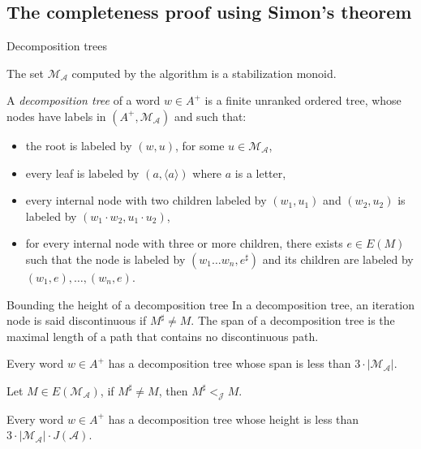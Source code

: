 \documentclass[svgnames]{beamer}
\renewcommand{\AA}{\mathcal{A}}
\newcommand{\JJ}{\mathcal{J}}
\newcommand{\MM}{\mathcal{M}}
\newcommand{\MMAA}{\MM_\AA}
\newcommand{\tr}[1]{\langle #1 \rangle}
\begin{document}
\subsection{The completeness proof using Simon's theorem}

\begin{frame}{Decomposition trees}

\begin{fact}
The set $\MMAA$ computed by the algorithm is a stabilization monoid.
\end{fact}

\begin{definition}
A \emph{decomposition tree} of a word $w \in A^+$ is a finite unranked ordered tree,
whose nodes have labels in $(A^+,\MMAA)$ and such that:
\begin{itemize}
	\item the root is labeled by $(w,u)$, for some $u \in \MMAA$,
	\item every leaf is labeled by $(a,\tr{a})$ where $a$ is a letter,
	\item every internal node with two children labeled by 
$(w_1,u_1)$ and $(w_2,u_2)$ is labeled by 
$(w_1 \cdot w_2,u_1 \cdot u_2)$,
	\item for every internal node with three or more children, 
there exists $e \in E(M)$ such that 
the node is labeled by $(w_1 \ldots w_n,e^\sharp)$
and its children are labeled by $(w_1,e),\ldots,(w_n,e)$.
\end{itemize}
\end{definition}
\end{frame}

\begin{frame}{Bounding the height of a decomposition tree}
In a decomposition tree,
an iteration node is said discontinuous if $M^\sharp \neq M$.
The span of a decomposition tree is the maximal length of a path that contains
no discontinuous path.

\pause
\begin{theorem}[Simon, 1990]
Every word $w \in A^+$ has a decomposition tree whose span is less than 
$3 \cdot |\MMAA|$.
\end{theorem}

\pause
\begin{lemma}[Simon, 1990]
Let $M \in E(\MMAA)$, if $M^\sharp \neq M$, then $M^\sharp <_\JJ M$.
\end{lemma}

\pause
\begin{corollary}
Every word $w \in A^+$ has a decomposition tree whose height is less than 
$3 \cdot |\MMAA| \cdot J(\AA)$.
\end{corollary}
\end{frame}
\end{document}
